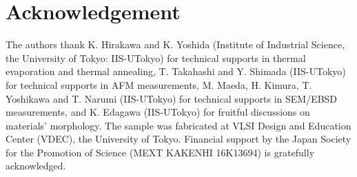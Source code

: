 \documentclass[aip,apl,reprint]{revtex4-1}
\begin{document}
\section*{Acknowledgement}
The authors thank K. Hirakawa and K. Yoshida (Institute of Industrial Science, the University of Tokyo: IIS-UTokyo) for technical supports in thermal evaporation and thermal annealing, T. Takahashi and Y. Shimada (IIS-UTokyo) for technical supports in AFM measurements, M. Maeda, H. Kimura, T. Yoshikawa and T. Narumi (IIS-UTokyo) for technical supports in SEM/EBSD measurements, and K. Edagawa (IIS-UTokyo) for fruitful discussions on materials' morphology. 
The sample was fabricated at VLSI Design and Education Center (VDEC), the University of Tokyo. Financial support by the Japan Society for the Promotion of Science (MEXT KAKENHI 16K13694) is gratefully acknowledged.


\end{document}
